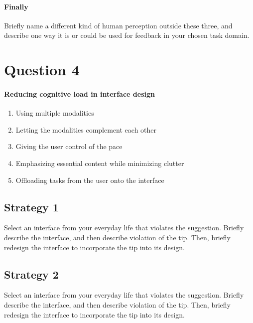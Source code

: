 \paragraph{Finally}
Briefly name a different kind of human perception outside these three, and describe one way it is or could be used for feedback in your chosen task domain.

\section{Question 4}

\paragraph{Reducing cognitive load in interface design}
\begin{enumerate}
\item
  Using multiple modalities
\item
  Letting the modalities complement each other
\item
  Giving the user control of the pace
\item
  Emphasizing essential content while minimizing clutter
\item
  Offloading tasks from the user onto the interface
\end{enumerate}

\subsection{Strategy 1}
Select an interface from your everyday life that violates the suggestion. Briefly describe the interface, and then describe violation of the tip. Then, briefly redesign the interface to incorporate the tip into its design.

\subsection{Strategy 2}
Select an interface from your everyday life that violates the suggestion. Briefly describe the interface, and then describe violation of the tip. Then, briefly redesign the interface to incorporate the tip into its design.


